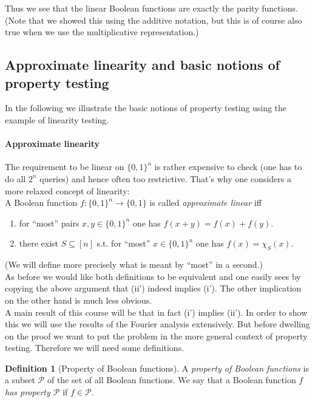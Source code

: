 \documentclass[a4paper]{article}
\newcommand{\prty}{\mathcal{P}}
\newcommand{\nset}{[n]}
\theoremstyle{plain}
\theoremstyle{definition}
\newtheorem{definition}{Definition}
\begin{document}
\noindent Thus we see that the linear Boolean functions are exactly
the parity functions. (Note that we showed this using the additive
notation, but this is of course also true when we use the
multiplicative representation.) 

\subsection{Approximate linearity and basic notions of property testing}
\label{sec:appr-line-basic}

In the following we illustrate the basic notions of property testing
using the example of linearity testing. 

\paragraph{Approximate linearity}
\label{sec:appr-line}

The requirement to be linear on \(\{0,1\}^n\) is rather expensive to
check (one has to do all \(2^n\) queries) and hence often too
restrictive. That's why one considers a more relaxed concept of
linearity: \\

\noindent A Boolean function \(f:\{0,1\}^n \rightarrow \{0,1\}\) is called
\emph{approximate linear} iff
\begin{enumerate}[label= (\roman*')]
\item for ``most'' pairs \(x,y \in \{0,1\}^n\) one has \(f(x+y) = f(x)
  + f(y)\).
\item there exist \(S \subseteq \nset\) s.t. for ``most'' \(x\in
  \{0,1\}^n\) one has \(f(x) = \chi_S(x)\). 
\end{enumerate}
(We will define more precisely what is meant by ``most'' in a
second.)\\

\noindent As before we would like both definitions to be equivalent
and one easily sees by copying the above argument that (ii') indeed
implies (i'). The other implication on the other hand is much less
obvious. \\
A main result of this course will be that in fact (i') implies
(ii'). In order to show this we will use the results of the Fourier
analysis extensively. But before dwelling on the proof we want to put
the problem in the more general context of property testing. Therefore
we will need some definitions. 

\begin{definition}[Property of Boolean functions]
  A \emph{property of Boolean functions} is a subset \(\prty\) of the
  set of all Boolean functions. We say that a Boolean function \(f\) \emph{has property \(\prty\)} if \(f
  \in \prty\). 
\end{definition}
\end{document}
